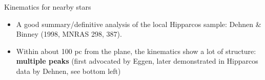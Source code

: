 \documentclass[letterpaper,landscape]{slides}
\begin{document}
\begin{slide}
{\begin{minipage}[t]{12.5cm}
\begin{center}
\vskip -1in
{\large \color{red} Kinematics for nearby stars }
\end{center}

\begin{itemize}
\item A good summary/definitive analysis of the local Hipparcos sample: 
   Dehnen \& Binney (1998, MNRAS 298, 387).  
\item Within about 100 pc from the plane, the kinematics show a lot of
      structure: {\bf multiple peaks} (first advocated by Eggen, later
      demonstrated in Hipparcos data by Dehnen, see bottom left)
\end{itemize}     

\end{minipage}}
\vfill 
\end{slide}
\end{document}
